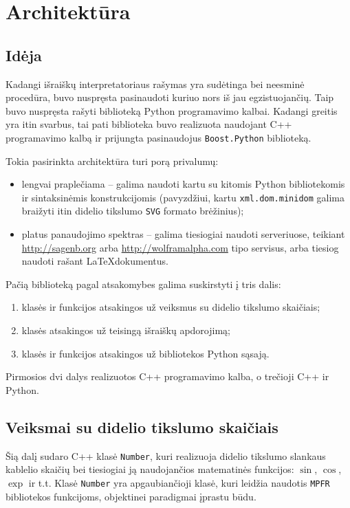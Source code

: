 \chapter{Architektūra}

\section{Idėja}

Kadangi išraiškų interpretatoriaus rašymas yra sudėtinga bei neesminė
procedūra, buvo nuspręsta pasinaudoti kuriuo nors iš jau egzistuojančių.
Taip buvo nuspręsta rašyti biblioteką Python programavimo kalbai. Kadangi
greitis yra itin svarbus, tai pati biblioteka buvo realizuota naudojant
C++ programavimo kalbą ir prijungta pasinaudojus \verb|Boost.Python| 
\cite{boost_python} biblioteką.

Tokia pasirinkta architektūra turi porą privalumų:
\begin{itemize}
  \item lengvai praplečiama – galima naudoti kartu su kitomis Python 
    bibliotekomis ir sintaksinėmis konstrukcijomis (pavyzdžiui, kartu
    \verb|xml.dom.minidom| galima braižyti itin didelio tikslumo 
    \verb|SVG| \cite{svg} formato brėžinius);
  \item platus panaudojimo spektras – galima tiesiogiai naudoti
    serveriuose, teikiant \url{http://sagenb.org} 
    arba \url{http://wolframalpha.com} tipo servisus, arba tiesiog
    naudoti rašant \LaTeX dokumentus.
\end{itemize}

Pačią biblioteką pagal atsakomybes galima suskirstyti į tris dalis:
\begin{enumerate}
  \item klasės ir funkcijos atsakingos už veiksmus su didelio tikslumo
    skaičiais;
  \item klasės atsakingos už teisingą išraiškų apdorojimą;
  \item klasės ir funkcijos atsakingos už bibliotekos Python sąsają.
\end{enumerate}
Pirmosios dvi dalys realizuotos C++ programavimo kalba, o trečioji
C++ ir Python.

\section{Veiksmai su didelio tikslumo skaičiais}

Šią dalį sudaro C++ klasė \verb|Number|, kuri realizuoja didelio tikslumo
slankaus kablelio skaičių bei tiesiogiai ją naudojančios matematinės
funkcijos: $\sin$, $\cos$, $\exp$ ir t.t. Klasė \verb|Number| yra 
apgaubiančioji klasė, kuri leidžia naudotis \verb|MPFR| \cite{mpfr} 
bibliotekos funkcijoms, objektinei paradigmai įprastu būdu.

